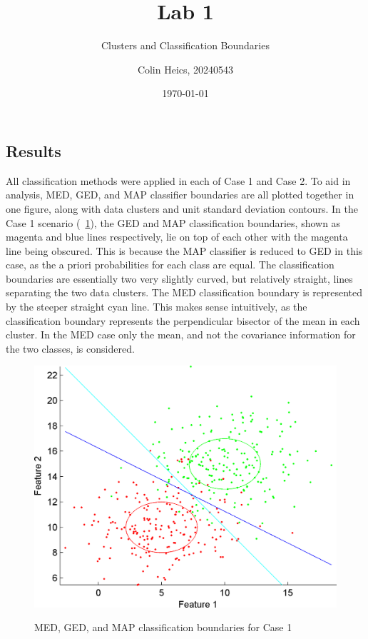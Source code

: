 \documentclass[article, 1.5space, letterpaper, 12pt, oneside, header, footer]{SydeClass}
\title{Lab 1}
\subtitle{Clusters and Classification Boundaries}
\author{Colin Heics, 20240543}
\date{\today}
\begin{document}









\subsection{Results}
All classification methods were applied in each of Case 1 and Case 2. To aid in analysis, MED, GED, and MAP classifier boundaries are all plotted together in one figure, along with data clusters and unit standard deviation contours. In the Case 1 scenario (~\ref{fig:med_ged_map_classifier_case1}), the GED and MAP classification boundaries, shown as magenta and blue lines respectively, lie on top of each other with the magenta line being obscured. This is because the MAP classifier is reduced to GED in this case, as the a priori probabilities for each class are equal. The classification boundaries are essentially two very slightly curved, but relatively straight, lines separating the two data clusters. The MED classification boundary is represented by the steeper straight cyan line. This makes sense intuitively, as the classification boundary represents the perpendicular bisector of the mean in each cluster. In the MED case only the mean, and not the covariance information for the two classes, is considered.

\begin{figure}[ht]
\centering
	{
	\includegraphics[width=0.45\linewidth]{fig2a-AB_MED_MICD_MAP}
	}
	
	\caption{MED, GED, and MAP classification boundaries for Case 1}
	\label{fig:med_ged_map_classifier_case1}
\end{figure}
\end{document}
